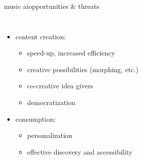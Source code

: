 \begin{frame}{music ai}{opportunities \& threats}
    \vspace{-3mm}
    \begin{columns}
    
        \begin{itemize}
            \item content creation:
                \begin{itemize}
                    \item speed-up, increased efficiency
                    \item creative possibilities (morphing, etc.)
                    \item co-creative idea givers
                    \item democratization
                \end{itemize}
            \smallskip
            \item consumption:
                \begin{itemize}
                    \item personalization
                    \item effective discovery and accessibility
                \end{itemize}
        \end{itemize}
    

\end{columns}
\end{frame}
